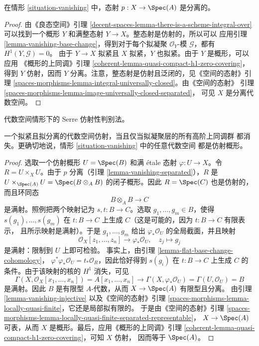 \begin{lemma}
\label{lemma-vanishing-separated}
在情形 \ref{situation-vanishing} 中，态射 $p : X \to \Spec(A)$ 是分离的。
\end{lemma}

\begin{proof}
由《良态空间》引理
\ref{decent-spaces-lemma-there-is-a-scheme-integral-over}
可以找到一个概形 $Y$ 和满整态射 $Y \to X$。整态射是仿射的，所以可以
应用引理 \ref{lemma-vanishing-base-change}，得到对于每个拟凝聚
$\mathcal{O}_Y$-模 $\mathcal{G}$，都有 $H^1(Y, \mathcal{G}) = 0$。
由于 $Y \to X$ 拟紧且 $X$ 拟紧，$Y$ 也拟紧。由于 $Y$ 是概形，可以应用
《概形的上同调》引理
\ref{coherent-lemma-quasi-compact-h1-zero-covering}，得到 $Y$ 仿射，因而
$Y$ 分离。注意，整态射是仿射且泛闭的，见《空间的态射》引理
\ref{spaces-morphisms-lemma-integral-universally-closed}。由《空间的态射》
引理 \ref{spaces-morphisms-lemma-image-universally-closed-separated}，
可见 $X$ 是分离代数空间。
\end{proof}

\begin{proposition}
\label{proposition-vanishing-affine}
\begin{slogan}
代数空间情形下的 Serre 仿射性判别法。
\end{slogan}
一个拟紧且拟分离的代数空间仿射，当且仅当拟凝聚层的所有高阶上同调群
都消失。更确切地说，情形 \ref{situation-vanishing} 中的任意代数空间
都是仿射概形。
\end{proposition}

\begin{proof}
选取一个仿射概形 $U = \Spec(B)$ 和满 \'etale 态射
$\varphi : U \to X$。令 $R = U \times_X U$。由于 $p$ 分离（引理
\ref{lemma-vanishing-separated}），$R$ 是
$U \times_{\Spec(A)} U = \Spec(B \otimes_A B)$ 的闭子概形。因此
$R = \Spec(C)$ 也是仿射的，而且环同态
$$
B \otimes_A B \longrightarrow C
$$
是满射。照例把两个映射记为 $s, t : B \to C$。选取
$g_1, \ldots, g_m \in B$，使得 $s(g_1), \ldots, s(g_m)$ 在
$t : B \to C$ 上生成 $C$（这是可能的，因为 $t : B \to C$ 有限表示，
且所示映射是满射）。于是 $g_1, \ldots, g_m$ 给出
$\varphi_*\mathcal{O}_U$ 的全局截面，并且映射
$$
\mathcal{O}_X[z_1, \ldots, z_n] \longrightarrow \varphi_*\mathcal{O}_U,
\quad
z_j \longmapsto g_j
$$
是满射：限制到 $U$ 上即可检验。%
事实上，由引理 \ref{lemma-flat-base-change-cohomology}，
$\varphi^*\varphi_*\mathcal{O}_U = t_*\mathcal{O}_R$，因此恰好得到
$s(g_i)$ 在 $t : B \to C$ 上生成 $C$ 的条件。由于该映射的核的
$H^1$ 消失，可见
$$
\Gamma(X, \mathcal{O}_X[x_1, \ldots, x_n]) =
A[x_1, \ldots, x_n] \longrightarrow
\Gamma(X, \varphi_*\mathcal{O}_U) = \Gamma(U, \mathcal{O}_U) = B
$$
是满射。因此 $B$ 是有限型 $A$-代数，从而 $X \to \Spec(A)$ 有限型且分离。
由引理 \ref{lemma-vanishing-injective} 以及《空间的态射》引理
\ref{spaces-morphisms-lemma-locally-quasi-finite}，它还是局部拟有限的。
于是由《空间的态射》引理
\ref{spaces-morphisms-lemma-locally-quasi-finite-separated-representable}，
$X \to \Spec(A)$ 可表，从而 $X$ 是概形。最后，应用《概形的上同调》引理
\ref{coherent-lemma-quasi-compact-h1-zero-covering}，可知 $X$ 仿射，
因而等于 $\Spec(A)$。
\end{proof}


